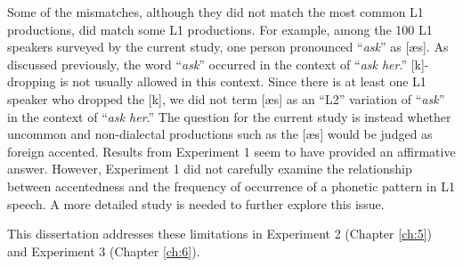 Some of the mismatches, although they did not match the most common L1 productions, did match some L1 productions. For example, among the 100 L1 speakers surveyed by the current study, one person pronounced “\textit{ask}” as [æs]. As discussed previously, the word “\textit{ask}” occurred in the context of “\textit{ask her}.” [k]-dropping is not usually allowed in this context. Since there is at least one L1 speaker who dropped the [k], we did not term [æs] as an “L2” variation of “\textit{ask}” in the context of “\textit{ask her}.” The question for the current study is instead whether uncommon and non-dialectal productions such as the [æs] would be judged as foreign accented. Results from Experiment 1 seem to have provided an affirmative answer. However, Experiment 1 did not carefully examine the relationship between accentedness and the frequency of occurrence of a phonetic pattern in L1 speech. A more detailed study is needed to further explore this issue. 

This dissertation addresses these limitations in Experiment 2 (Chapter \ref{ch:5}) and Experiment 3 (Chapter \ref{ch:6}). 














